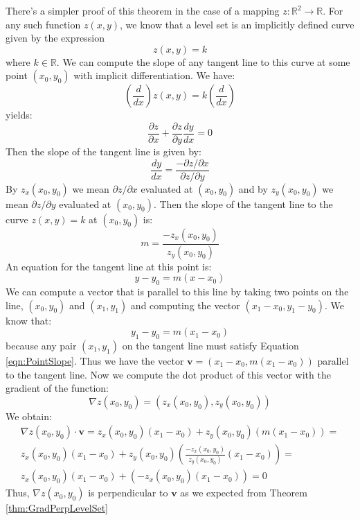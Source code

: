 \begin{remark}There's a simpler proof of this theorem in the case of a mapping $z : \mathbb{R}^2 \rightarrow \mathbb{R}$. For any such function $z(x,y)$, we know that a level set is an implicitly defined curve given by the expression
\begin{displaymath}
z(x,y) = k
\end{displaymath}
where $k \in \mathbb{R}$. We can compute the slope of any tangent line to this curve at some point $(x_0,y_0)$ with implicit differentiation. We have:
\begin{displaymath}
\left(\frac{d}{dx}\right) z(x,y) = k \left(\frac{d}{dx}\right)
\end{displaymath}
yields:
\begin{displaymath}
\frac{\partial z}{\partial x} + \frac{\partial z}{\partial y}\frac{dy}{dx}  = 0 
\end{displaymath}
Then the slope of the tangent line is given by:
\begin{displaymath}
\frac{dy}{dx} = \frac{-\partial z/\partial x}{\partial z/\partial y}
\end{displaymath}
By $z_x(x_0,y_0)$ we mean $\partial z/\partial x$ evaluated at $(x_0,y_0)$ and by $z_y(x_0,y_0)$ we mean $\partial z/\partial y$ evaluated at $(x_0,y_0)$. Then the slope of the tangent line to the curve $z(x,y) = k$ at $(x_0,y_0)$ is:
\begin{displaymath}
m = \frac{-z_x(x_0,y_0)}{z_y(x_0,y_0)}
\end{displaymath}
An equation for the tangent line at this point is:
\begin{equation}
y - y_0 = m(x - x_0)
\label{eqn:PointSlope}
\end{equation}
We can compute a vector that is parallel to this line by taking two points on the line, $(x_0,y_0)$ and $(x_1, y_1)$ and computing the vector $(x_1 - x_0, y_1 - y_0)$. We know that:
\begin{displaymath}
y_1 - y_0 = m(x_1 - x_0)
\end{displaymath}
because any pair $(x_1,y_1)$ on the tangent line must satisfy Equation \ref{eqn:PointSlope}. Thus we have the vector $\mathbf{v} = (x_1 - x_0, m(x_1 - x_0))$ parallel to the tangent line. Now we compute the dot product of this vector with the gradient of the function:
\begin{displaymath}
\nabla z(x_0,y_0) = (z_x(x_0,y_0), z_y(x_0,y_0))
\end{displaymath}
We obtain:
\begin{multline*}
\nabla z(x_0,y_0)\cdot\mathbf{v} = z_x(x_0,y_0)\left(x_1 - x_0\right) + z_y(x_0,y_0)\left(m(x_1 - x_0)\right) = \\z_x(x_0,y_0)\left(x_1 - x_0\right) + 
z_y(x_0,y_0)\left(\frac{-z_x(x_0,y_0)}{z_y(x_0,y_0)}(x_1 - x_0)\right)
 = \\
z_x(x_0,y_0)\left(x_1 - x_0\right) + \left(-z_x(x_0,y_0)(x_1 - x_0)\right) = 0
\end{multline*}
Thus, $\nabla z(x_0,y_0)$ is perpendicular to $\mathbf{v}$ as we expected from Theorem \ref{thm:GradPerpLevelSet}
\end{remark}

